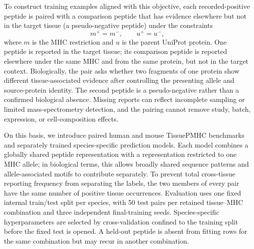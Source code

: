 To construct training examples aligned with this objective, each recorded-positive peptide is paired with a comparison peptide that has evidence elsewhere but not in the target tissue (a pseudo-negative peptide) under the constraints
\[
m^{+}=m^{-}, \qquad u^{+}=u^{-},
\]
where \(m\) is the MHC restriction and \(u\) is the parent UniProt protein. One peptide is reported in the target tissue; its comparison peptide is reported elsewhere under the same MHC and from the same protein, but not in the target context. Biologically, the pair asks whether two fragments of one protein show different tissue-associated evidence after controlling the presenting allele and source-protein identity. The second peptide is a pseudo-negative rather than a confirmed biological absence. Missing reports can reflect incomplete sampling or limited mass-spectrometry detection, and the pairing cannot remove study, batch, expression, or cell-composition effects.

On this basis, we introduce paired human and mouse TissuePMHC benchmarks and separately trained species-specific prediction models. Each model combines a globally shared peptide representation with a representation restricted to one MHC allele; in biological terms, this allows broadly shared sequence patterns and allele-associated motifs to contribute separately. To prevent total cross-tissue reporting frequency from separating the labels, the two members of every pair have the same number of positive tissue occurrences. Evaluation uses one fixed internal train/test split per species, with 50 test pairs per retained tissue--MHC combination and three independent final-training seeds. Species-specific hyperparameters are selected by cross-validation confined to the training split before the fixed test is opened. A held-out peptide is absent from fitting rows for the same combination but may recur in another combination.

